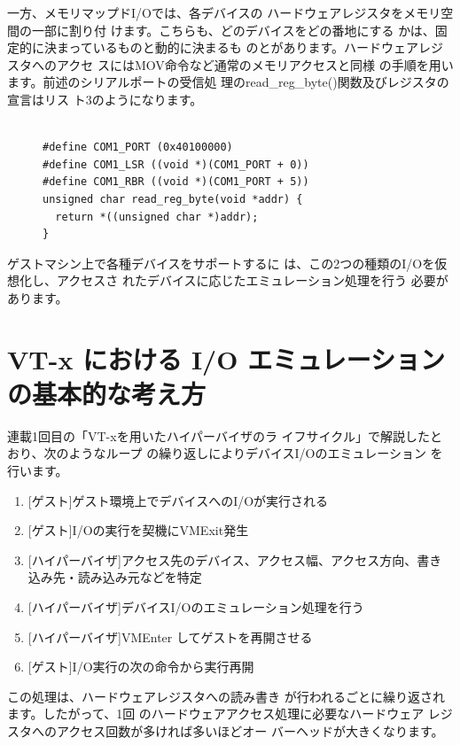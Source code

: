  一方、メモリマップドI/Oでは、各デバイスの
ハードウェアレジスタをメモリ空間の一部に割り付
けます。こちらも、どのデバイスをどの番地にする
かは、固定的に決まっているものと動的に決まるも
のとがあります。ハードウェアレジスタへのアクセ
スにはMOV命令など通常のメモリアクセスと同様
の手順を用います。前述のシリアルポートの受信処
理のread\_reg\_byte()関数及びレジスタの宣言はリス
ト3のようになります。

\begin{figure}\centering
\begin{verbatim}

#define COM1_PORT (0x40100000)
#define COM1_LSR ((void *)(COM1_PORT + 0))
#define COM1_RBR ((void *)(COM1_PORT + 5))
unsigned char read_reg_byte(void *addr) {
  return *((unsigned char *)addr);
}
\end{verbatim}
\end{figure}

 ゲストマシン上で各種デバイスをサポートするに
は、この2つの種類のI/Oを仮想化し、アクセスさ
れたデバイスに応じたエミュレーション処理を行う
必要があります。


\section{VT-x における I/O エミュレーションの基本的な考え方}

 連載1回目の「VT-xを用いたハイパーバイザのラ
イフサイクル」で解説したとおり、次のようなループ
の繰り返しによりデバイスI/Oのエミュレーション
を行います。

\begin{enumerate}
\item{[ゲスト]ゲスト環境上でデバイスへのI/Oが実行される}
\item{[ゲスト]I/Oの実行を契機にVMExit発生}
\item{[ハイパーバイザ]アクセス先のデバイス、アクセス幅、アクセス方向、書き込み先・読み込み元などを特定}
\item{[ハイパーバイザ]デバイスI/Oのエミュレーション処理を行う}
\item{[ハイパーバイザ]VMEnter してゲストを再開させる}
\item{[ゲスト]I/O実行の次の命令から実行再開}
\end{enumerate}

 この処理は、ハードウェアレジスタへの読み書き
が行われるごとに繰り返されます。したがって、1回
のハードウェアアクセス処理に必要なハードウェア
レジスタへのアクセス回数が多ければ多いほどオー
バーヘッドが大きくなります。


